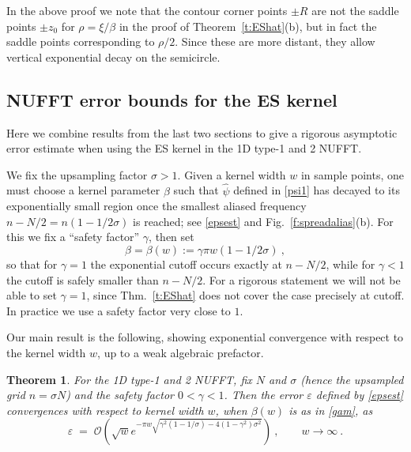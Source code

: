 \documentclass[10pt]{article}
\newcommand{\be}{\begin{equation}}
\newcommand{\ee}{\end{equation}}
\newcommand{\eps}{\varepsilon}
\newcommand{\bigO}{{\mathcal O}}
\newtheorem{thm}{Theorem}
\newtheorem{lem}[thm]{Lemma}
\newcommand{\freq}{\beta}          %
\newcommand{\rat}{\sigma}          %
\begin{document}
In the above proof we note that the contour corner points $\pm R$ are not
the saddle points $\pm z_0$ for $\rho=\xi/\freq$
in the proof of Theorem~\ref{t:EShat}(b),
but in fact the saddle points corresponding to $\rho/2$.
Since these are more distant, they allow vertical exponential
decay on the semicircle.





\subsection{NUFFT error bounds for the ES kernel}

Here we combine results from the last two sections to give a rigorous
asymptotic error estimate when using the ES kernel in the 1D
type-1 and 2 NUFFT.

We fix the upsampling factor $\rat>1$.
Given a kernel width $w$ in sample points, one must choose
a kernel parameter $\freq$ such that $\hat\psi$ defined in \eqref{psi1}
has decayed to its
exponentially small region once the smallest aliased
frequency $n-N/2 = n(1-1/2\rat)$ is reached; see \eqref{epsest} and
Fig.~\ref{f:spreadalias}(b).
For this we fix a ``safety factor'' $\gamma$, then set
\be
\freq = \freq(w) := \gamma \pi w (1-1/2\rat)~,
\label{gam}
\ee
so that for $\gamma=1$ the exponential cutoff occurs exactly at $n-N/2$,
while for $\gamma<1$ the cutoff is safely smaller than $n-N/2$.
For a rigorous statement we will not be able to set
$\gamma=1$, since Thm.~\ref{t:EShat}
does not cover the case precisely at cutoff.
In practice we use a safety factor very close to $1$.

Our main result is the following, showing exponential convergence
with respect to the kernel width $w$, up to a weak algebraic prefactor.
\begin{thm} %
  For the 1D type-1 and 2 NUFFT, fix $N$ and $\rat$ (hence the upsampled grid $n=\sigma N$) and the safety factor $0<\gamma<1$.
  Then the error $\eps$ defined by \eqref{epsest} convergences with respect to
  kernel width $w$, when $\freq(w)$ is as in \eqref{gam},
  as
  \be
  \eps \;=\; \bigO\left( \sqrt{w} e^{-\pi w \sqrt{\gamma^2(1-1/\rat) - 4(1-\gamma^2)\rat^2}}
  \right)
  ~, \qquad w\to \infty ~.
  \label{ESerr}
  \ee
  \label{t:ESerr}
\end{thm}  %
\end{document}
